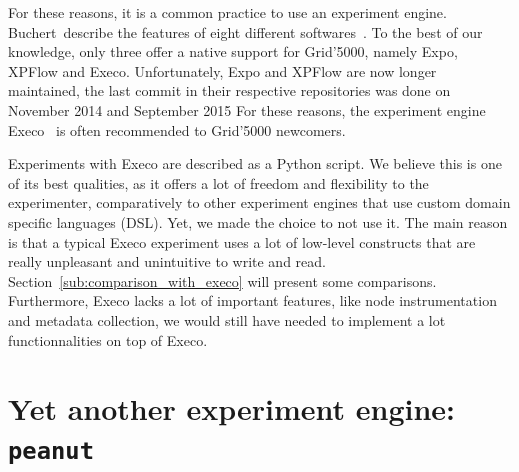             For these reasons, it is a common practice to use an experiment engine. Buchert~\etal describe the features
            of eight different softwares~\cite{buchert:hal-01087519}. To the best of our knowledge, only three offer a
            native support for Grid'5000, namely Expo, XPFlow and Execo. Unfortunately, Expo and XPFlow are now longer
            maintained, the last commit in their respective repositories was done on November 2014 and September 2015
            For these reasons, the experiment engine Execo~\cite{Imbert_2013} is often recommended to Grid'5000
            newcomers.

            Experiments with Execo are described as a Python script. We believe this is one of its best qualities, as it
            offers a lot of freedom and flexibility to the experimenter, comparatively to other experiment engines that
            use custom domain specific languages (DSL). Yet, we made the choice to not use it. The main reason is that a
            typical Execo experiment uses a lot of low-level constructs that are really unpleasant and unintuitive to
            write and read. Section~\ref{sub:comparison_with_execo} will present some comparisons. Furthermore, Execo
            lacks a lot of important features, like node instrumentation and metadata collection, \ie we would still
            have needed to implement a lot functionnalities on top of Execo.

    \section{Yet another experiment engine: \texttt{peanut}}%
    \label{sec:peanut}
